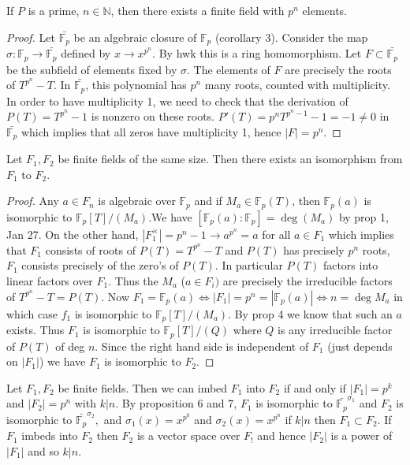 \begin{prop}
If $P$ is a prime, $n\in\mathbb{N}$, then there exists a finite field with $p^n$ elements.
\end{prop}
\begin{proof} Let $\bar{\mathbb{F}_p}$ be an algebraic closure of $\mathbb{F}_p$ (corollary 3). Consider the map $\sigma:\mathbb{F}_p\longrightarrow\bar{\mathbb{F}_p}$ defined by $x\longrightarrow x^{p^n}$. By hwk this is a ring homomorphism. Let $F\subset\bar{\mathbb{F}_p}$ be the subfield of elements fixed by $\sigma$. The elements of $F$ are precisely the roots of $T^{p^n}-T$. In $\bar{\mathbb{F}_p}$, this polynomial has $p^n$ many roots, counted with multiplicity. In order to have multiplicity 1, we need to check that the derivation of $P(T)=T^{p^n}-1$ is nonzero on these roots. $P'(T)=p^nT^{p^n-1}-1=-1\ne 0$ in $\bar{\mathbb{F}_p}$ which implies that all zeros have multiplicity 1, hence $|F|=p^n$. 
\end{proof}
\begin{prop}
Let $F_1,F_2$ be finite fields of the same size. Then there exists an isomorphism from $F_1$ to $F_2$. 
\end{prop}
\begin{proof}
Any $a\in F_n$ is algebraic over $\mathbb{F}_p$ and if $M_a\in \mathbb{F}_p(T)$, then $\mathbb{F}_p(a)$ is isomorphic to $\mathbb{F}_p[T]/(M_a)$.We have $[\mathbb{F}_p(a):\mathbb{F}_p]=\deg(M_a)$ by prop 1, Jan 27. On the other hand, $|F_1^{\times}|=p^n-1\longrightarrow a^{p^n}=a$ for all $a\in F_1$ which implies that $F_1$ consists of roots of $P(T)=T^{p^n}-T$ and $P(T)$ has precisely $p^n$ roots, $F_1$ consists precisely of the zero's of $P(T)$. In particular $P(T)$ factors into linear factors over $F_1$. 
Thus the $M_a$ ($a\in F_i)$ are precisely the irreducible factors of $T^{p^n}-T=P(T)$. Now $F_1=\mathbb{F}_p(a)\iff |F_1|=p^n=|\mathbb{F}_p(a)|\iff n=\deg M_a$ in which case $f_1$ is isomorphic to $\mathbb{F}_p[T]/(M_a).$ By prop 4 we know that such an $a$ exists. Thus $F_1$ is isomorphic to $\mathbb{F}_p[T]/(Q)$ where $Q$ is any irreducible factor of $P(T)$ of deg $n$. Since the right hand side is independent of $F_1$ (just depends on $|F_1|$) we have $F_1$ is isomorphic to $F_2$.
\end{proof}
\begin{cor}
Let $F_1,F_2$ be finite fields. Then we can imbed $F_1$ into $F_2$ if and only if $|F_1|=p^k$ and $|F_2|=p^n$ with $k|n$. By proposition 6 and 7, $F_1$ is isomorphic to $\bar{\mathbb{F}_p}^{\sigma_1}$ and $F_2$ is isomorphic to $\bar{\mathbb{F}_p}^{\sigma_2},$ and $\sigma_1(x)=x^{p^k}$ and $\sigma_2(x)=x^{p^n}$ if $k|n$ then $F_1\subset F_2$. If $F_1$ imbeds into $F_2$ then $F_2$ is a vector space over $F_!$ and hence $|F_2|$ is a power of $|F_1|$ and so $k|n$.
\end{cor}